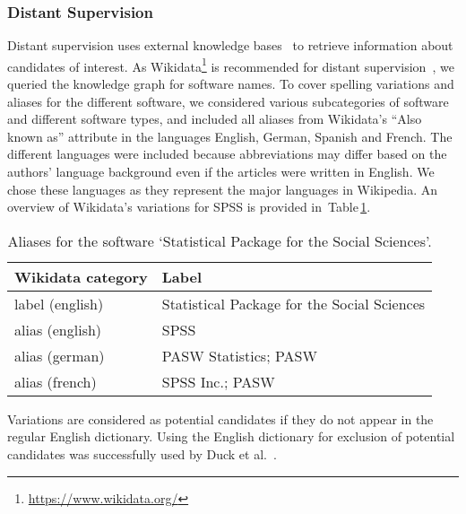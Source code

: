 \documentclass[runningheads]{llncs}
\newcommand{\tabref}[1]{Table\,\ref{#1}}
\begin{document}
\subsubsection{Distant Supervision}
Distant supervision uses external knowledge bases~\cite{mintz2009distant} to retrieve information about candidates of interest.
As Wikidata\footnote{\url{https://www.wikidata.org/}} is recommended for distant supervision~\cite{weichselbraun2019name}, we queried the knowledge graph for software names.
To cover spelling variations and aliases for the different software, we considered various subcategories of software and different software types, and included all aliases from Wikidata's ``Also known as'' attribute in the languages English, German, Spanish and French.
The different languages were included because abbreviations may differ based on the authors' language background even if the articles were written in English.  
We chose these languages as they represent the major languages in Wikipedia.
An overview of Wikidata's variations for SPSS is provided in~\tabref{tab:spss_distant}.
\begin{table}[tb]
    \caption{Aliases for the software `Statistical Package for the Social Sciences'.}
    \label{tab:spss_distant}
    \centering
    \begin{tabularx}{.8\textwidth}{p{3cm}X}
        \toprule
        Wikidata category & Label\\
        \midrule
        label (english) & Statistical Package for the Social Sciences\\
        alias (english) & SPSS\\
        alias (german) & PASW Statistics; PASW\\
        alias (french) & SPSS Inc.; PASW\\
        \bottomrule
    \end{tabularx}
\end{table}
Variations are considered as potential candidates if they do not appear in the regular English dictionary.
Using the English dictionary for exclusion of potential candidates was successfully used by Duck et al.~\cite{duck2013bionerds}.

\newcommand\dl[1]{\protect\dashuline{#1}}
\newcommand\dtl[1]{\protect\dotuline{#1}}
\end{document}
